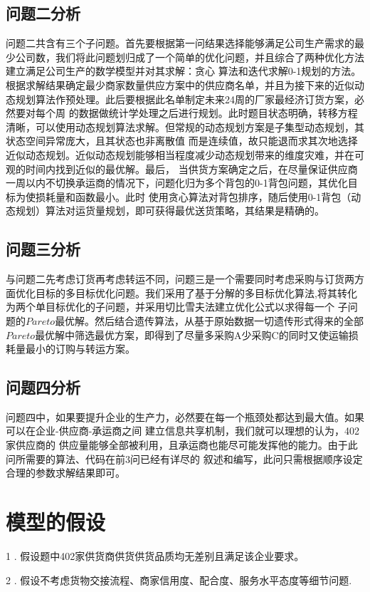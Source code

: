 \documentclass[withoutpreface,bwprint]{cumcmthesis}
\begin{document}
\subsection{问题二分析}
问题二共含有三个子问题。首先要根据第一问结果选择能够满足公司生产需求的最少公司数，我们将此问题划归成了一个简单的优化问题，并且综合了两种优化方法建立满足公司生产的数学模型并对其求解：贪心
算法和迭代求解0-1规划的方法。根据求解结果确定最少商家数量供应方案中的供应商名单，并且为接下来的近似动态规划算法作预处理。此后要根据此名单制定未来24周的厂家最经济订货方案，必然要对每个周
的数据做统计学处理之后进行规划。此时题目状态明确，转移方程清晰，可以使用动态规划算法求解。但常规的动态规划方案是子集型动态规划，其状态空间异常庞大，且其状态也非离散值
而是连续值，故只能退而求其次地选择近似动态规划。近似动态规划能够相当程度减少动态规划带来的维度灾难，并在可观的时间内找到近似的最优解。最后，
当供货方案确定之后，在尽量保证供应商一周以内不切换承运商的情况下，问题化归为多个背包的0-1背包问题，其优化目标为使损耗量和函数最小。此时
使用贪心算法对背包排序，随后使用0-1背包（动态规划）算法对运货量规划，即可获得最优送货策略，其结果是精确的。

\subsection{问题三分析}
与问题二先考虑订货再考虑转运不同，问题三是一个需要同时考虑采购与订货两方面优化目标的多目标优化问题。我们采用了基于分解的多目标优化算法\cite{3},将其转化为两个单目标优化的子问题，并采用切比雪夫法建立优化公式以求得每一个
子问题的$Pareto$最优解。然后结合遗传算法，从基于原始数据一切遗传形式得来的全部$Pareto$最优解中筛选最优方案，即得到了尽量多采购A少采购C的同时又使运输损耗量最小的订购与转运方案。
\subsection{问题四分析}
问题四中，如果要提升企业的生产力，必然要在每一个瓶颈处都达到最大值。如果可以在企业-供应商-承运商之间
建立信息共享机制，我们就可以理想的认为，402家供应商的
供应量能够全部被利用，且承运商也能尽可能发挥他的能力。由于此问所需要的算法、代码在前3问已经有详尽的
叙述和编写，此问只需根据顺序设定合理的参数求解结果即可。

\section{模型的假设}
1 . 假设题中402家供货商供货供货品质均无差别且满足该企业要求。

2 . 假设不考虑货物交接流程、商家信用度、配合度、服务水平态度等细节问题.
\end{document}
